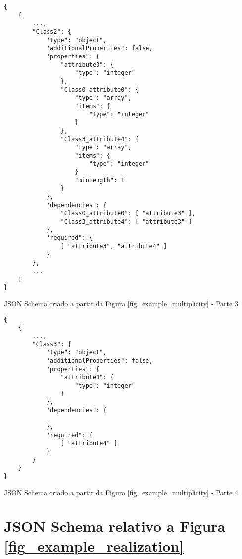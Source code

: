 \begin{anexosenv}
\begin{listing}
\begin{verbatim}
{
    {
        ...,
        "Class2": {
            "type": "object",
            "additionalProperties": false,
            "properties": {
                "attribute3": {
                    "type": "integer"
                },
                "Class0_attribute0": {
                    "type": "array",
                    "items": {
                        "type": "integer"
                    }
                },
                "Class3_attribute4": {
                    "type": "array",
                    "items": {
                        "type": "integer"
                    }
                    "minLength": 1
                }
            },
            "dependencies": {
                "Class0_attribute0": [ "attribute3" ],
                "Class3_attribute4": [ "attribute3" ]
            },
            "required": {
                [ "attribute3", "attribute4" ]
            }
        },
        ...
    }
}
\end{verbatim}
\caption{JSON Schema criado a partir da Figura \ref{fig_example_multiplicity} - Parte 3}
\end{listing}

\begin{listing}
\begin{verbatim}
{
    {
        ...,
        "Class3": {
            "type": "object",
            "additionalProperties": false,
            "properties": {
                "attribute4": {
                    "type": "integer"
                }
            },
            "dependencies": {
            
            },
            "required": {
                [ "attribute4" ]
            }
        }
    }
}
\end{verbatim}
\caption{JSON Schema criado a partir da Figura \ref{fig_example_multiplicity} - Parte 4}
\end{listing}


\chapter{JSON Schema relativo a Figura \ref{fig_example_realization}}
\label{fig_example_realization_j}


\end{anexosenv}
